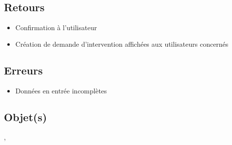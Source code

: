 	\subsection{Retours}
	\begin{itemize}
		\item Confirmation à l'utilisateur
		\item Création de demande d'intervention affichées aux utilisateurs concernés
	\end{itemize}

	\subsection{Erreurs}
	\begin{itemize}
		\item Données en entrée incomplètes \warning
	\end{itemize}

	\subsection{Objet(s)}
		\logs, \event

%
%
%
%
%
